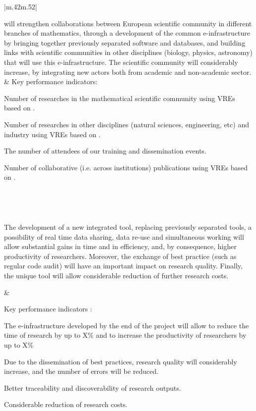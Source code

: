 \begin{supertabular}{|m{.42\textwidth}m{.52\textwidth}|}\hline\hline
{}\\\hline

  \TheProject will strengthen collaborations between European scientific community in
  different branches of mathematics, through a development of the common e-infrastructure
  by bringing together previously separated software and databases, and building links with
  scientific communities in other disciplines (biology, physics, astronomy) that will use
  this e-infrastructure. The scientific community will considerably increase, by
  integrating new actors both from academic and non-academic sector. 
& Key performance indicators:
  \begin{compactenum}
  \item Number of researches in the mathematical scientific community 
        using VREs based on \TheProject.
  \item Number of researches in other disciplines (natural sciences, 
        engineering, etc) and industry using VREs based on \TheProject.
  \item The number of attendees of our training and dissemination events.
  \item Number of collaborative (i.e. across institutions) publications 
        using VREs based on \TheProject.
  \end{compactenum} \\\hline

  \hline{}\\\hline

  The development of a new integrated tool, replacing %
    previously separated tools, a possibility of real time data sharing, data re-use and
    simultaneous working will allow substantial gains in time and in efficiency, and, by
    consequence, higher productivity of researchers. Moreover, the exchange of best
    practice (such as regular code audit) will have an important impact on research
    quality. Finally, the unique tool will allow considerable reduction of further 
    research costs.

 &

  Key performance indicators :
  \begin{compactenum}
\item The e-infrastructure developed by the end of the project will allow to reduce
the time of research by up to X\% and to increase the productivity of researchers by 
up to X\%
\item Due to the dissemination of best practices, research quality will considerably 
increase, and the number of errors will be reduced.
\item Better traceability and discoverability of research outputs.
\item Considerable reduction of research costs.
\end{compactenum}


\end{supertabular}
